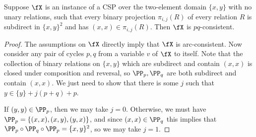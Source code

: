 \begin{lem} Suppose $\fX$ is an instance of a CSP over the two-element domain $\{x,y\}$ with no unary relations, such that every binary projection $\pi_{i,j}(R)$ of every relation $R$ is subdirect in $\{x,y\}^2$ and has $(x,x) \in \pi_{i,j}(R)$. Then $\fX$ is $pq$-consistent.
\end{lem}
\begin{proof} The assumptions on $\fX$ directly imply that $\fX$ is arc-consistent. Now consider any pair of cycles $p,q$ from a variable $v$ of $\fX$ to itself. Note that the collection of binary relations on $\{x,y\}$ which are subdirect and contain $(x,x)$ is closed under composition and reversal, so $\PP_p,\PP_q$ are both subdirect and contain $(x,x)$. We just need to show that there is some $j$ such that $y \in \{y\} + j(p+q) + p$.

If $(y,y) \in \PP_p$, then we may take $j = 0$. Otherwise, we must have $\PP_p = \{(x,x), (x,y), (y,x)\}$, and since $(x,x) \in \PP_q$ this implies that $\PP_p \circ \PP_q \circ \PP_p = \{x,y\}^2$, so we may take $j = 1$. %
\end{proof}


